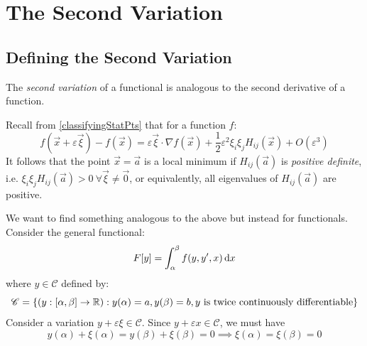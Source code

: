 \documentclass[../main.tex]{subfiles}
\begin{document}
\chapter{The Second Variation}
\section{Defining the Second Variation}
The \textit{second variation} of a functional is analogous to the second derivative of a function.
\begin{remark}[Recap]
  Recall from \cref{classifyingStatPts} that for a function $f$:
  \[
    f(\vec{x} + \varepsilon \vec{\xi}) - f(\vec{x}) = \varepsilon \vec{\xi} \cdot \nabla f(\vec{x}) + \frac{1}{2} \varepsilon^2 \xi_i \xi_j H_{i j}(\vec{x}) + O(\varepsilon^3)
  \]
  It follows that the point $\vec{x} = \vec{a}$ is a local minimum if $H_{i j}(\vec{a})$ is \textit{positive definite}, i.e. $\xi_i\xi_j H_{i j}(\vec{a}) > 0\ \forall \vec{\xi} \neq \vec{0}$, or equivalently, all eigenvalues of $H_{i j}(\vec{a})$ are positive.
\end{remark}
We want to find something analogous to the above but instead for functionals.
Consider the general functional:
\[
  F[y] = \int_{\alpha}^{\beta} f(y, y', x) \d{x}
\]
where $y \in \mathscr{C}$ defined by:
\[
  \mathscr{C} = \{(y: [\alpha, \beta] \to \mathbb{R}) : y(\alpha) = a, y(\beta) = b, \text{$y$ is twice continuously differentiable}\}
\]
Consider a variation $y + \varepsilon \xi \in \mathscr{C}$.
Since $y + \varepsilon x \in \mathscr{C}$, we must have
\begin{equation}
  y(\alpha) + \xi(\alpha) = y(\beta) + \xi(\beta) = 0 \implies \xi(\alpha) = \xi(\beta) = 0 \label{xiBdd}
\end{equation}
\end{document}
